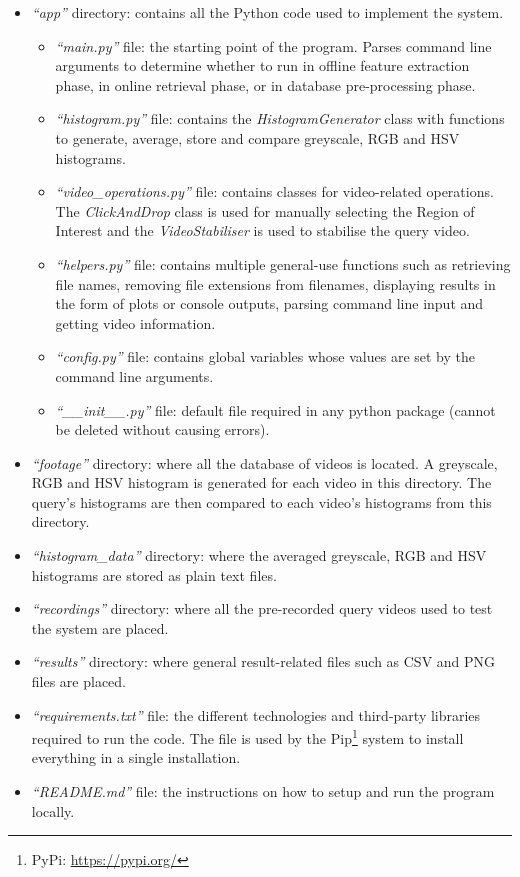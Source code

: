 \begin{itemize}
    \item \textit{``app''} directory: contains all the Python code used to implement the system.
    \begin{itemize}
        \item \textit{``main.py''} file: the starting point of the program. Parses command line arguments to determine whether to run in offline feature extraction phase, in online retrieval phase, or in database pre-processing phase.
        \item \textit{``histogram.py''} file: contains the \textit{HistogramGenerator} class with functions to generate, average, store and compare greyscale, RGB and HSV histograms.
        \item \textit{``video\_operations.py''} file: contains classes for video-related operations. The \textit{ClickAndDrop} class is used for manually selecting the Region of Interest and the \textit{VideoStabiliser} is used to stabilise the query video.
        \item \textit{``helpers.py''} file: contains multiple general-use functions such as retrieving file names, removing file extensions from filenames, displaying results in the form of plots or console outputs, parsing command line input and getting video information.
        \item \textit{``config.py''} file: contains global variables whose values are set by the command line arguments.
        \item \textit{``\_\_init\_\_.py''} file: default file required in any python package (cannot be deleted without causing errors).
    \end{itemize}
    \item \textit{``footage''} directory: where all the database of videos is located. A greyscale, RGB and HSV histogram is generated for each video in this directory. The query's histograms are then compared to each video's histograms from this directory.
    \item \textit{``histogram\_data''} directory: where the averaged greyscale, RGB and HSV histograms are stored as plain text files.
    \item \textit{``recordings''} directory: where all the pre-recorded query videos used to test the system are placed.
    \item \textit{``results''} directory: where general result-related files such as CSV and PNG files are placed.
    \item \textit{``requirements.txt''} file: the different technologies and third-party libraries required to run the code. The file is used by the Pip\footnote{PyPi: \url{https://pypi.org/}} system to install everything in a single installation.
    \item \textit{``README.md''} file: the instructions on how to setup and run the program locally.
\end{itemize}

